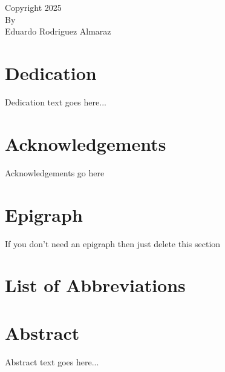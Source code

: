 \chapter*{}
\vspace*{\fill} 
\begin{center} 
	Copyright 2025 \\
	By \\ 
	Eduardo Rodriguez Almaraz
\end{center}
\vspace*{\fill}

\chapter*{Dedication}
Dedication text goes here...

\chapter*{Acknowledgements}

Acknowledgements go here

\chapter*{Epigraph}

If you don't need an epigraph then just delete this section



\chapter*{} %

\tableofcontents


\chapter*{} %
\listoffigures


\chapter*{} %
\listoftables

\chapter*{List of Abbreviations}

\chapter*{Abstract}
Abstract text goes here...

